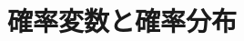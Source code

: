 \documentclass[../../topic_probability-statistics]{subfiles}
\begin{document}
\chapter{確率変数と確率分布}



\end{document}
